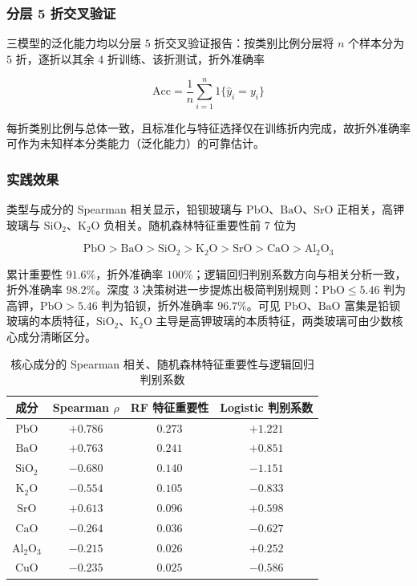 \documentclass{ctexart}
\begin{document}
\subsubsection{分层 5 折交叉验证}

三模型的泛化能力均以分层 $5$ 折交叉验证报告：按类别比例分层将 $n$ 个样本分为 $5$ 折，逐折以其余 $4$ 折训练、该折测试，折外准确率

\begin{equation*}
\mathrm{Acc}=\frac{1}{n}\sum_{i=1}^{n}\mathrm{1}\{\widehat{y}_{i}=y_{i}\}
\end{equation*}

每折类别比例与总体一致，且标准化与特征选择仅在训练折内完成，故折外准确率可作为未知样本分类能力（泛化能力）的可靠估计。


\subsubsection{实践效果}

类型与成分的 Spearman 相关显示，铅钡玻璃与 $\mathrm{PbO}$、$\mathrm{BaO}$、$\mathrm{SrO}$ 正相关，高钾玻璃与 $\mathrm{SiO_2}$、$\mathrm{K_2O}$ 负相关。随机森林特征重要性前 $7$ 位为

\begin{equation*}
\mathrm{PbO}>\mathrm{BaO}>\mathrm{SiO_2}>\mathrm{K_2O}>\mathrm{SrO}>\mathrm{CaO}>\mathrm{Al_2O_3}
\end{equation*}

累计重要性 $91.6\%$，折外准确率 $100\%$；逻辑回归判别系数方向与相关分析一致，折外准确率 $98.2\%$。深度 $3$ 决策树进一步提炼出极简判别规则：$\mathrm{PbO}\le5.46$ 判为高钾，$\mathrm{PbO}>5.46$ 判为铅钡，折外准确率 $96.7\%$。可见 $\mathrm{PbO}$、$\mathrm{BaO}$ 富集是铅钡玻璃的本质特征，$\mathrm{SiO_2}$、$\mathrm{K_2O}$ 主导是高钾玻璃的本质特征，两类玻璃可由少数核心成分清晰区分。

\begin{table}[htbp]
\centering
\caption{核心成分的 Spearman 相关、随机森林特征重要性与逻辑回归判别系数}
\label{tab:core}
\begin{tabular}{c|c|c|c}
\hline
成分 & Spearman $\rho$ & RF 特征重要性 & Logistic 判别系数 \\
\hline
$\mathrm{PbO}$ & $+0.786$ & $0.273$ & $+1.221$ \\
$\mathrm{BaO}$ & $+0.763$ & $0.241$ & $+0.851$ \\
$\mathrm{SiO_2}$ & $-0.680$ & $0.140$ & $-1.151$ \\
$\mathrm{K_2O}$ & $-0.554$ & $0.105$ & $-0.833$ \\
$\mathrm{SrO}$ & $+0.613$ & $0.096$ & $+0.598$ \\
$\mathrm{CaO}$ & $-0.264$ & $0.036$ & $-0.627$ \\
$\mathrm{Al_2O_3}$ & $-0.215$ & $0.026$ & $+0.252$ \\
$\mathrm{CuO}$ & $-0.235$ & $0.025$ & $-0.586$ \\
\hline
\end{tabular}
\end{table}
\end{document}
